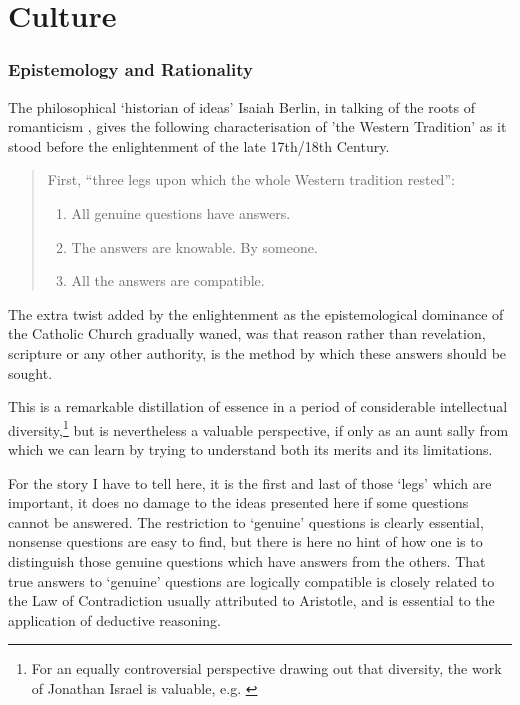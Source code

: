 \documentclass[10pt,titlepage]{book}
\begin{document}
\chapter{Culture}
\subsection{Epistemology and Rationality}

The philosophical `historian of ideas' Isaiah Berlin, in talking of the roots of romanticism \cite{berlinRR}, gives the following characterisation of 'the Western Tradition' as it stood before the enlightenment of the late 17th/18th Century.

\begin{quotation}

First, ``three legs upon which the whole Western tradition rested'':
\begin{enumerate}
\item All genuine questions have answers.
\item The answers are knowable.  By someone.
\item All the answers are compatible.
\end{enumerate}
\end{quotation}

The extra twist added by the enlightenment as the epistemological dominance of the Catholic Church gradually waned, was that reason rather than revelation, scripture or any other authority, is the method by which these answers should be sought.

This is a remarkable distillation of essence in a period of considerable intellectual diversity,\footnote{For an equally controversial perspective drawing out that diversity, the work of Jonathan Israel is valuable, e.g. \cite{israel2002radical, israel2013democratic}}%
 but is nevertheless a valuable perspective, if only as an aunt sally from which we can learn by trying to understand both its merits and its limitations.

 For the story I have to tell here, it is the first and last of those `legs' which are important, it does no damage to the ideas presented here if some questions cannot be answered.
 The restriction to `genuine' questions is clearly essential, nonsense questions are easy to find, but there is here no hint of how one is to distinguish those genuine questions which have answers from the others.
That true answers to `genuine' questions are logically compatible is closely related to the Law of Contradiction usually attributed to Aristotle, and is essential to the application of deductive reasoning.
\end{document}
